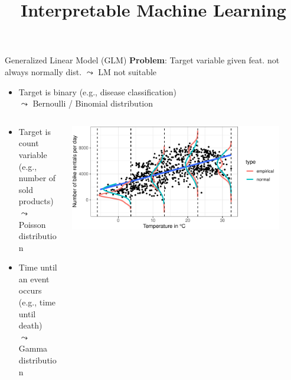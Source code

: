 \documentclass[11pt,compress,t,notes=noshow, aspectratio=169, xcolor=table]{beamer}
\title{Interpretable Machine Learning}
\date{}
\begin{document}
\newcommand{\titlefigure}{figure/logreg-2vars-surface}%
\newcommand{\learninggoals}{
\item Definition of GLMs
\item Logistic regression as example
\item Interpretation in logistic regression
}



\begin{frame}{Generalized Linear Model (GLM) }
\vspace{-0.2cm}
\textbf{Problem}: Target variable given feat. not always normally dist. $\leadsto$ LM not suitable
\begin{itemize}
    \item Target is binary (e.g., disease classification)\\
    $\leadsto$ Bernoulli / Binomial distribution
\end{itemize}
\vspace{-0.5cm}
\begin{columns}
    \begin{column}{0.45\textwidth}
        \begin{itemize}
            \item Target is count variable \\(e.g., number of sold products)\\
            $\leadsto$ Poisson distribution
            \item Time until an event occurs\\ (e.g., time until death)\\
            $\leadsto$ Gamma distribution
        \end{itemize}
    \end{column}
    \begin{column}{0.55\textwidth}
    \vspace{-0.4cm}
        \begin{center}
            \includegraphics[width = 0.9\textwidth]{figure/density_intervals.pdf}

\end{center}
\end{column}
\end{columns}
\end{frame}
\end{document}
